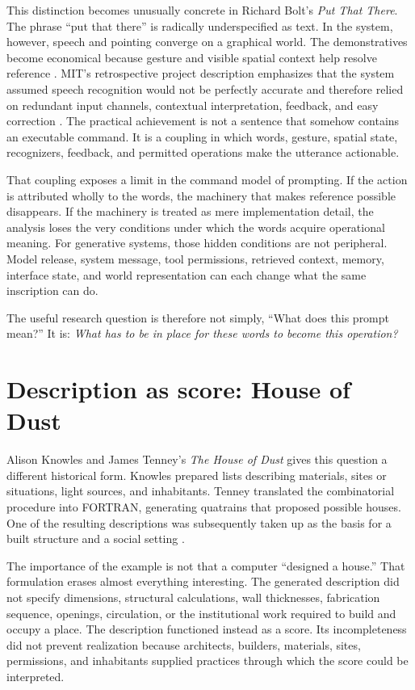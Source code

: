 \documentclass[11pt]{article}
\begin{document}
This distinction becomes unusually concrete in Richard Bolt's \emph{Put That There}. The phrase ``put that there'' is radically underspecified as text. In the system, however, speech and pointing converge on a graphical world. The demonstratives become economical because gesture and visible spatial context help resolve reference \citep{bolt1980}. MIT's retrospective project description emphasizes that the system assumed speech recognition would not be perfectly accurate and therefore relied on redundant input channels, contextual interpretation, feedback, and easy correction \citep{mitputthatthere}. The practical achievement is not a sentence that somehow contains an executable command. It is a coupling in which words, gesture, spatial state, recognizers, feedback, and permitted operations make the utterance actionable.

That coupling exposes a limit in the command model of prompting. If the action is attributed wholly to the words, the machinery that makes reference possible disappears. If the machinery is treated as mere implementation detail, the analysis loses the very conditions under which the words acquire operational meaning. For generative systems, those hidden conditions are not peripheral. Model release, system message, tool permissions, retrieved context, memory, interface state, and world representation can each change what the same inscription can do.

The useful research question is therefore not simply, ``What does this prompt mean?'' It is: \emph{What has to be in place for these words to become this operation?}

\section{Description as score: House of Dust}
Alison Knowles and James Tenney's \emph{The House of Dust} gives this question a different historical form. Knowles prepared lists describing materials, sites or situations, light sources, and inhabitants. Tenney translated the combinatorial procedure into FORTRAN, generating quatrains that proposed possible houses. One of the resulting descriptions was subsequently taken up as the basis for a built structure and a social setting \citep{houseofdust1967}.

The importance of the example is not that a computer ``designed a house.'' That formulation erases almost everything interesting. The generated description did not specify dimensions, structural calculations, wall thicknesses, fabrication sequence, openings, circulation, or the institutional work required to build and occupy a place. The description functioned instead as a score. Its incompleteness did not prevent realization because architects, builders, materials, sites, permissions, and inhabitants supplied practices through which the score could be interpreted.
\end{document}
